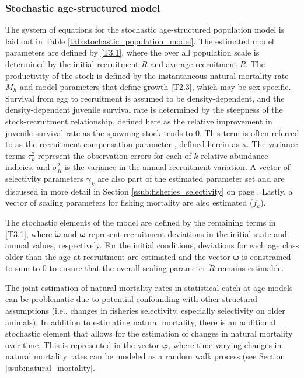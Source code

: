 \subsubsection{Stochastic age-structured model} %
\label{ssub:stochastic_age_structured_model}
    The system of equations for the stochastic age-structured population model is laid out in Table \ref{tab:stochastic_population_model}.  The estimated model parameters are defined by \eqref{T3.1}, where the over all population scale is determined by the initial recruitment $\ddot{R}$ and average recruitment $\bar{R}$.  The productivity of the stock is defined by the instantaneous natural mortality rate $M_h$ and model parameters that define growth \eqref{T2.3}, which may be sex-specific.  Survival from egg to recruitment is assumed to be density-dependent, and the density-dependent juvenile survival rate is determined by the steepness of the stock-recruitment relationship, defined here as the relative improvement in juvenile survival rate as the spawning stock tends to 0. This term is often referred to as the recruitment compensation parameter \citep{goodyear1993spawning}, defined herein as $\kappa$. The variance terms $\tau^2_k$  represent the observation errors for each of $k$ relative abundance indicies, and $\sigma_R^2$ is the variance in the annual recruitment variation.  A vector of selectivity parameters $\bm{\gamma}_k$ are also part of the estimated parameter set and are discussed in more detail in Section \ref{ssub:fisheries_selectivity} on page \pageref{ssub:fisheries_selectivity}.  Lastly, a vector of scaling parameters for fishing mortality are also estimated ($\bar{f}_k$).

    The stochastic elements of the model are defined by the remaining terms in \eqref{T3.1}, where $\ddot{\bm{\omega}}$ and $\bm{\omega}$ represent recruitment deviations in the initial state and annual values, respectively.  For the initial conditions, deviations for each age class older than the age-at-recruitment are estimated and the vector $\bm{\omega}$ is constrained to sum to 0 to ensure that the overall scaling parameter $\ddot{R}$ remains estimable.

    The joint estimation of natural mortality rates in statistical catch-at-age models can be problematic due to potential confounding with other structural assumptions (i.e., changes in fisheries selectivity, especially selectivity on older animals).  In addition to estimating natural mortality, there is an additional stochastic element that allows for the estimation of changes in natural mortality over time.  This is represented in the vector $\bm{\varphi}$, where time-varying changes in natural mortality rates can be modeled as a random walk process (see Section \ref{ssub:natural_mortality}.

